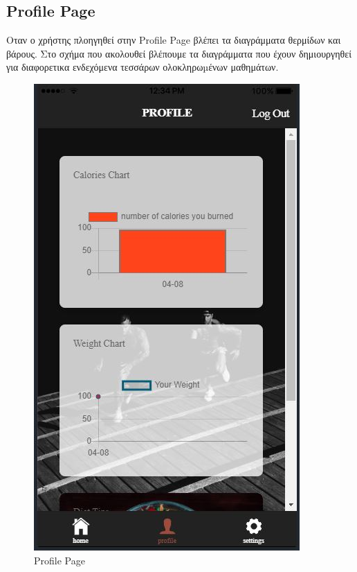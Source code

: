 \documentclass[a4paper,12pt]{article}
\begin{document}
		\newpage
		\subsection{Profile Page}

		Οταν ο χρήστης πλοηγηθεί στην Profile Page βλέπει τα διαγράμματα θερμίδων και βάρους. Στο σχήμα που ακολουθεί βλέπουμε τα διαγράμματα που έχουν δημιουργηθεί
		για διαφορετικα ενδεχόμενα τεσσάρων ολοκληρωµένων μαθημάτων.
		\vspace*{1cm}
		\begin{figure}[!htb]
			\caption{Profile Page}
			\vspace*{0.5cm}

			  \includegraphics[width=\linewidth]{lesson5}

\end{figure}
\end{document}
